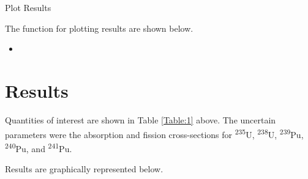 \documentclass[11pt,notitlepage]{article}
\newcommand{\tss}{\textsuperscript}
\newcommand{\pythonscript}[2]{
\begin{itemize}
\item[]
\end{itemize}
}
\newcommand{\cmark}{\ding{51}}%
\newcommand{\done}{\rlap{$\square$}{\raisebox{2pt}{\large\hspace{1pt}\cmark}}%
  \hspace{-2.5pt}}
\begin{document}
\begin{todolist}
  


  
\item[\done]{Plot Results}

  The function for plotting results are shown below.

  \pythonscript{../Origen2/PLOToutput}{Code for plots}

  
\end{todolist}



\section{Results}

Quantities of interest are shown in Table \ref{Table:1} above.
The uncertain parameters were the absorption and fission
cross-sections for \tss{235}U, \tss{238}U, \tss{239}Pu,
\tss{240}Pu, and \tss{241}Pu.

Results are graphically represented below. 
\end{document}
